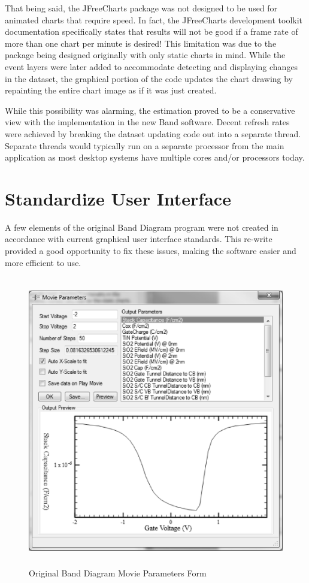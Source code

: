 \documentclass[project]{bsu-ms}
\begin{document}
That being said, the JFreeCharts package was not designed to be used for animated charts that require speed. In fact, the JFreeCharts development toolkit documentation specifically states that results will not be good if a frame rate of more than one chart per minute is desired! This limitation was due to the package being designed originally with only static charts in mind. While the event layers were later added to accommodate detecting and displaying changes in the dataset, the graphical portion of the code updates the chart drawing by repainting the entire chart image as if it was just created. 

While this possibility was alarming, the estimation proved to be a conservative view with the implementation in the new Band software. Decent refresh rates were achieved by breaking the dataset updating code out into a separate thread. Separate threads would typically run on a separate processor from the main application as most desktop systems have multiple cores and/or processors today.



\section{Standardize User Interface}\label{sec:standardizeUserInterface}
A few elements of the original Band Diagram program were not created in accordance with current graphical user interface standards. This re-write provided a good opportunity to fix these issues, making the software easier and more efficient to use.

\begin{figure}[ht]
\begin{center}
\includegraphics*[width=7.0in,height=5.0in,keepaspectratio]{movieParam.eps}
\end{center}
\caption{Original Band Diagram Movie Parameters Form}
\label{fig:movieParam}
\end{figure}
\end{document}
